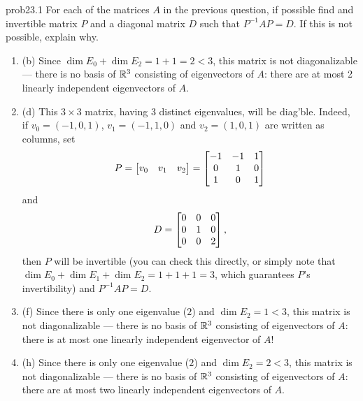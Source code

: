 
\begin{sol}{prob23.1} For each of the matrices $A$  in the previous question, if possible find and invertible matrix $P$ and a diagonal matrix $D$ such that $P^{-1}AP =D$. If this is not possible, explain why. 

\soln
\begin{enumerate}[]
\item (b) Since $\dim E_0 +\dim E_2=1+1=2<3$, this matrix is not diagonalizable --- there is no basis of $\mathbb{R}^3$ consisting of eigenvectors of $A$: there are at most 2 linearly independent eigenvectors of $A$.
\medskip
\item (d) This $3 \times 3$ matrix, having 3 distinct eigenvalues, will be diag'ble. Indeed, if $v_0=(-1,0,1)$, $v_1=(-1,1,0)$ and $v_2=(1,0,1)$ are written as columns, set $$P=\bmatrix v_0&v_1& v_2\endbmatrix = \bmatrix 
-1&-1&1\\
0&1&0\\
1&0&1\endbmatrix $$ and $$D= \bmatrix 
0&0&0\\
0&1&0\\
0&0&2\endbmatrix,$$ then $P$ will be invertible (you can check this directly, or simply note that $\dim E_0+\dim E_1 +\dim E_2 =1+1+1=3$, which guarantees $P$'s invertibility) and $P^{-1}AP =D$. \medskip
\item (f) Since there is only one eigenvalue ($2$) and $\dim E_2=1<3$,  this matrix is not diagonalizable --- there is no basis of $\mathbb{R}^3$ consisting of eigenvectors of $A$: there is at most one linearly independent eigenvector of $A$!
\medskip
\item (h) Since there is only one eigenvalue ($2$) and $\dim E_2=2<3$,  this matrix is not diagonalizable --- there is no basis of $\mathbb{R}^3$ consisting of eigenvectors of $A$: there are at most two linearly independent eigenvectors of $A$.
\medskip


\end{enumerate}



\end{sol}

